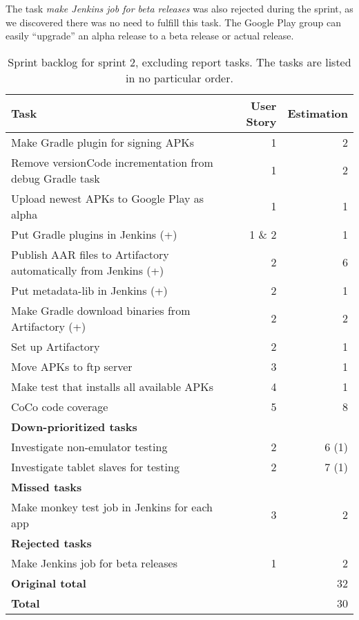 The task \emph{make Jenkins job for beta releases} was also rejected during the sprint, as we discovered there was no need to fulfill this task. The Google Play group can easily ``upgrade'' an alpha release to a beta release or actual release.

\begin{table}%
  \centering
  \begin{tabular}{p{}rr}
    \toprule
    \textbf{Task} & \textbf{User Story} & \textbf{Estimation} \\
    \midrule
    Make Gradle plugin for signing APKs                            & 1      & 2 \\
    Remove versionCode incrementation from debug Gradle task       & 1      & 2 \\
    Upload newest APKs to Google Play as alpha                     & 1      & 1 \\
    Put Gradle plugins in Jenkins (+)                              & 1 \& 2 & 1 \\
    Publish AAR files to Artifactory automatically from Jenkins (+)& 2      & 6 \\
    Put metadata-lib in Jenkins (+)                                & 2      & 1 \\
    Make Gradle download binaries from Artifactory (+)             & 2      & 2 \\
    Set up Artifactory                                             & 2      & 1 \\
    Move APKs to ftp server                                        & 3      & 1 \\
    Make test that installs all available APKs                     & 4      & 1 \\
    CoCo code coverage                                             & 5      & 8 \\
    \midrule
    \textbf{Down-prioritized tasks} & & \\
    \midrule
    Investigate non-emulator testing                               & 2      & 6 (1) \\
    Investigate tablet slaves for testing                          & 2      & 7 (1) \\
    \midrule
    \textbf{Missed tasks} & & \\
    \midrule
    Make monkey test job in Jenkins for each app                   & 3      & 2 \\
    \midrule
    \textbf{Rejected tasks} & & \\
    \midrule
    Make Jenkins job for beta releases                             & 1      & 2 \\
    \midrule
    \textbf{Original total} & & 32 \\
    \textbf{Total} & & 30 \\
    \bottomrule
  \end{tabular}
\caption[Sprint 2 backlog]{Sprint backlog for sprint 2, excluding report tasks. The tasks are listed in no particular order.}
\label{tab:sprint2_tasks}
\end{table}